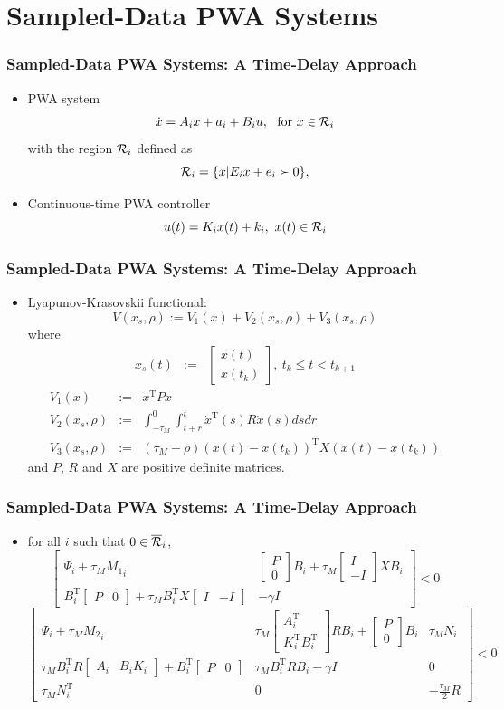 \documentclass{beamer}
\newcommand{\TR}{\text{T}}
\newcommand{\RR}{{\cal R}}
\newcommand{\beq}{\begin{equation*}}
\newcommand{\eeq}{\end{equation*}}
\newcommand{\bmat}{\left[\begin{array}}
\newcommand{\emat}{\end{array}\right]}
\begin{document}
\section[]{Sampled-Data PWA Systems}
  \frame
  {
    \frametitle{Sampled-Data PWA Systems: A Time-Delay Approach}
\begin{itemize}
\item<1-> PWA system
\beq
\dot x=A_ix+a_i+B_iu,\ \text{ for }x\in\RR_i
\eeq
with the region $\RR_i$ defined as
\beq
\RR_i=\{x| E_ix+e_i\succ 0\},
\eeq
\item<2-> Continuous-time PWA controller
\beq
u(t)=K_ix(t)+k_i,\ x(t)\in\RR_i
\eeq
\end{itemize}
}  

  \frame
  {
    \frametitle{Sampled-Data PWA Systems: A Time-Delay Approach}
    \begin{itemize}
    \item Lyapunov-Krasovskii functional:
\beq
V(x_s,\rho) := V_1(x)+V_2(x_s,\rho)+V_3(x_s,\rho)
\eeq
where 
\begin{eqnarray}
x_s(t) &:=& \bmat{c}x(t)\\x(t_k)\emat,\ t_k\leq t<t_{k+1}\nonumber
\end{eqnarray}
\begin{eqnarray}
V_1(x)&:=&x^\TR Px\nonumber\\
V_2(x_s,\rho)&:=&\int_{-\tau_M}^0\int_{t+r}^t\dot x^\TR(s)R\dot x(s)dsdr\nonumber\\
V_3(x_s,\rho)&:=&(\tau_M-\rho)(x(t)-x(t_k))^\TR X(x(t)-x(t_k))\nonumber
\end{eqnarray}
and $P$, $R$ and $X$ are positive definite matrices.
\end{itemize}
  }

  \frame
  {  
    \frametitle{Sampled-Data PWA Systems: A Time-Delay Approach}
\begin{itemize}
\item for all $i$ such that $0\in\overline\RR_i$,
{\scriptsize 
\beq
\bmat{cc}\Psi_i+\tau_M {M_1}_i&\bmat{c}P\\0\emat B_i+\tau_M\bmat{c}I\\-I\emat X B_i\\B_i^\TR\bmat{cc}P&0\emat+\tau_M B_i^\TR X\bmat{cc}I&-I\emat &-\gamma I\emat<0
\eeq
\beq
\bmat{ccc}\Psi_i+\tau_M {M_2}_i&\tau_M\bmat{c}A_i^\TR\\K_i^\TR B_i^\TR\emat R B_i+\bmat{c}P\\0\emat B_i&\tau_M N_i\\
\tau_M B_i^\TR R \bmat{cc} A_i & B_i K_i\emat+B_i^\TR\bmat{cc}P&0\emat&\tau_M B_i^\TR R B_i-\gamma I & 0\\
\tau_M N_i^\TR & 0 & -\frac{\tau_M}{2} R\emat<0
\eeq}
\end{itemize}
}
\end{document}
